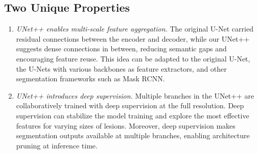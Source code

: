 \subsection{Two Unique Properties}
\label{ch4:approach_property:several_unique_properties}

\begin{enumerate}

    \item \textit{UNet++ enables multi-scale feature aggregation.} The original U-Net carried residual connections between the encoder and decoder, while our UNet++ suggests dense connections in between, reducing semantic gaps and encouraging feature reuse. This idea can be adapted to the original U-Net, the U-Nets with various backbones as feature extractors, and other segmentation frameworks such as Mask RCNN.
    
    \item \textit{UNet++ introduces deep supervision.} Multiple branches in the UNet++ are collaboratively trained with deep supervision at the full resolution. Deep supervision can stabilize the model training and explore the most effective features for varying sizes of lesions. Moreover, deep supervision makes segmentation outputs available at multiple branches, enabling architecture pruning at inference time.
    
    
\end{enumerate}

